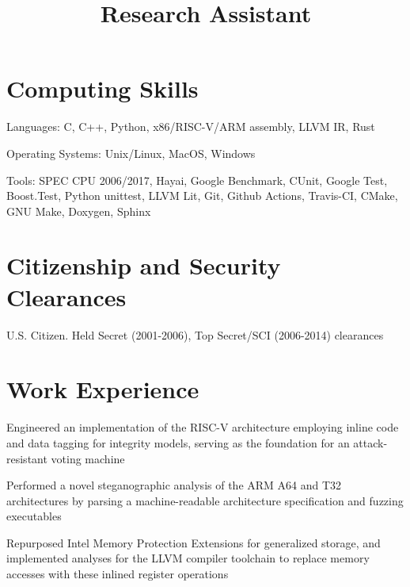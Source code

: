 \documentclass[line]{res}
\begin{document}
\begin{resume}
\section{Computing Skills}
\begin{list2}
\item Languages: C, C++, Python, x86/RISC-V/ARM assembly, LLVM IR, Rust
\item Operating Systems: Unix/Linux, MacOS, Windows
\item Tools: SPEC CPU 2006/2017, Hayai, Google Benchmark, CUnit, Google Test, Boost.Test, Python unittest, LLVM Lit, Git, Github Actions, Travis-CI, CMake, GNU Make, Doxygen, Sphinx
\end{list2}

\section{Citizenship and Security Clearances}
U.S. Citizen. Held {\sc Secret} (2001-2006), {\sc Top Secret/SCI} (2006-2014) clearances

\section{Work Experience}

\title{{\bf Research Assistant}}
\begin{position}
\vspace*{-.2cm}
\begin{list2}
	\item Engineered an implementation of the RISC-V architecture employing inline code and data tagging for integrity models, serving as the foundation for an attack-resistant voting machine
	\item Performed a novel steganographic analysis of the ARM A64 and T32 architectures by parsing a machine-readable architecture specification and fuzzing executables
	\item Repurposed Intel Memory Protection Extensions for generalized storage, and implemented analyses for the LLVM compiler toolchain to replace memory accesses with these inlined register operations
\end{list2}
\end{position}


\end{resume}
\end{document}
